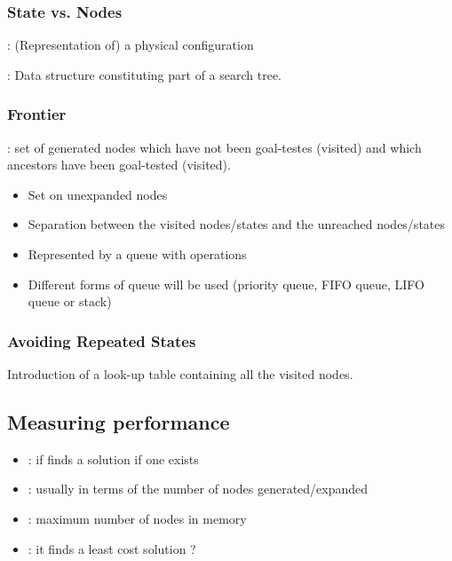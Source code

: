 \subsubsection{State vs. Nodes}

 : (Representation of) a physical configuration

 : Data structure constituting part of a search tree.

\subsubsection{Frontier}

 : set of generated nodes which have not been goal-testes (visited) and which ancestors have been goal-tested (visited).

\begin{itemize}
\item Set on unexpanded nodes
\item Separation between the visited nodes/states and the unreached nodes/states
\item Represented by a queue with operations
\item Different forms of queue will be used (priority queue, FIFO queue, LIFO queue or stack)
\end{itemize}

\subsubsection{Avoiding Repeated States}

Introduction of a look-up table containing all the visited nodes.

\subsection{Measuring performance}

\begin{itemize}
\item {} : if finds a solution if one exists
\item {} : usually in terms of the number of nodes generated/expanded
\item {} : maximum number of nodes in memory
\item {} : it finds a least cost solution ?
\end{itemize}

